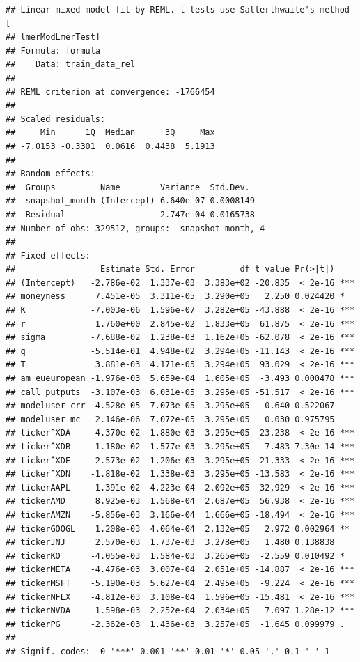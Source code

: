\documentclass[
]{article}
\begin{document}
\begin{verbatim}
## Linear mixed model fit by REML. t-tests use Satterthwaite's method [
## lmerModLmerTest]
## Formula: formula
##    Data: train_data_rel
## 
## REML criterion at convergence: -1766454
## 
## Scaled residuals: 
##     Min      1Q  Median      3Q     Max 
## -7.0153 -0.3301  0.0616  0.4438  5.1913 
## 
## Random effects:
##  Groups         Name        Variance  Std.Dev. 
##  snapshot_month (Intercept) 6.640e-07 0.0008149
##  Residual                   2.747e-04 0.0165738
## Number of obs: 329512, groups:  snapshot_month, 4
## 
## Fixed effects:
##                 Estimate Std. Error         df t value Pr(>|t|)    
## (Intercept)   -2.786e-02  1.337e-03  3.383e+02 -20.835  < 2e-16 ***
## moneyness      7.451e-05  3.311e-05  3.290e+05   2.250 0.024420 *  
## K             -7.003e-06  1.596e-07  3.282e+05 -43.888  < 2e-16 ***
## r              1.760e+00  2.845e-02  1.833e+05  61.875  < 2e-16 ***
## sigma         -7.688e-02  1.238e-03  1.162e+05 -62.078  < 2e-16 ***
## q             -5.514e-01  4.948e-02  3.294e+05 -11.143  < 2e-16 ***
## T              3.881e-03  4.171e-05  3.294e+05  93.029  < 2e-16 ***
## am_eueuropean -1.976e-03  5.659e-04  1.605e+05  -3.493 0.000478 ***
## call_putputs  -3.107e-03  6.031e-05  3.295e+05 -51.517  < 2e-16 ***
## modeluser_crr  4.528e-05  7.073e-05  3.295e+05   0.640 0.522067    
## modeluser_mc   2.146e-06  7.072e-05  3.295e+05   0.030 0.975795    
## ticker^XDA    -4.370e-02  1.880e-03  3.295e+05 -23.238  < 2e-16 ***
## ticker^XDB    -1.180e-02  1.577e-03  3.295e+05  -7.483 7.30e-14 ***
## ticker^XDE    -2.573e-02  1.206e-03  3.295e+05 -21.333  < 2e-16 ***
## ticker^XDN    -1.818e-02  1.338e-03  3.295e+05 -13.583  < 2e-16 ***
## tickerAAPL    -1.391e-02  4.223e-04  2.092e+05 -32.929  < 2e-16 ***
## tickerAMD      8.925e-03  1.568e-04  2.687e+05  56.938  < 2e-16 ***
## tickerAMZN    -5.856e-03  3.166e-04  1.666e+05 -18.494  < 2e-16 ***
## tickerGOOGL    1.208e-03  4.064e-04  2.132e+05   2.972 0.002964 ** 
## tickerJNJ      2.570e-03  1.737e-03  3.278e+05   1.480 0.138838    
## tickerKO      -4.055e-03  1.584e-03  3.265e+05  -2.559 0.010492 *  
## tickerMETA    -4.476e-03  3.007e-04  2.051e+05 -14.887  < 2e-16 ***
## tickerMSFT    -5.190e-03  5.627e-04  2.495e+05  -9.224  < 2e-16 ***
## tickerNFLX    -4.812e-03  3.108e-04  1.596e+05 -15.481  < 2e-16 ***
## tickerNVDA     1.598e-03  2.252e-04  2.034e+05   7.097 1.28e-12 ***
## tickerPG      -2.362e-03  1.436e-03  3.257e+05  -1.645 0.099979 .  
## ---
## Signif. codes:  0 '***' 0.001 '**' 0.01 '*' 0.05 '.' 0.1 ' ' 1
\end{verbatim}
\end{document}
